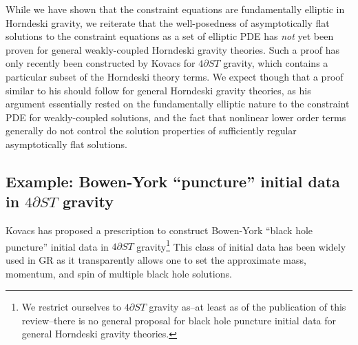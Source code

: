 \documentclass{ws-ijmpd}
\begin{document}
While we have shown that the constraint equations are fundamentally
elliptic in Horndeski gravity, we reiterate that the well-posedness
of asymptotically flat solutions to
the constraint equations as a set of elliptic PDE has \emph{not} yet been
proven for general weakly-coupled Horndeski gravity theories.
Such a proof has only recently been constructed  
by Kovacs\cite{Kovacs:2021lgk} for $4\partial ST$ gravity, 
which contains a particular subset of the Horndeski theory terms.
We expect though that a proof similar to his should follow for general Horndeski
gravity theories, as his argument essentially rested on the fundamentally
elliptic nature to the constraint PDE for weakly-coupled solutions,
and the fact that nonlinear lower order
terms generally do not control the solution properties of sufficiently regular
asymptotically flat solutions.

\subsection{Example:
Bowen-York ``puncture'' initial data in $4\partial ST$ gravity
\label{sec:puncture_initial_data}
}
Kovacs has proposed a prescription to construct Bowen-York 
``black hole puncture'' 
initial data\cite{Kovacs:2021lgk} in $4\partial ST$ gravity\footnote{We 
restrict ourselves to $4\partial ST$ gravity as--at least
as of the publication of this review--there is
no general proposal for black hole puncture initial data for
general Horndeski gravity theories.}
This class of initial data has been widely used in GR
as it transparently allows one to set the 
approximate mass, momentum, and spin
of multiple black hole solutions\cite{Ansorg:2004ds}.
\end{document}
